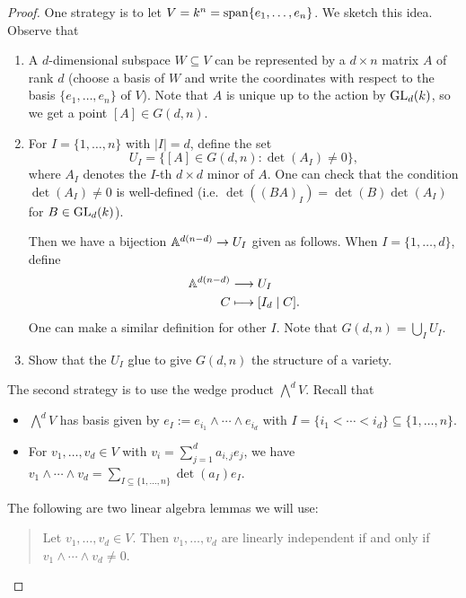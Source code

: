 \begin{proof}
  One strategy is to let
  $V = k^n = \operatorname{span}\{e_1, \dots, e_n\}$.
  We sketch this idea.
  Observe that
  \begin{enumerate}
    \item A $d$-dimensional subspace
      $W \subseteq V$ can be represented by
      a $d \times n$ matrix $A$ of
      rank $d$ (choose a basis of $W$ and
      write the coordinates with respect
      to the basis $\{e_1, \dots, e_n\}$
      of $V$).
      Note that $A$ is unique up to
      the action by
      $\operatorname{GL}_d(k)$, so we get a point
      $[A] \in G(d, n)$.
    \item For $I = \{1, \dots, n\}$ with
      $|I| = d$, define the set
      \[
        U_I = \{
          [A] \in G(d, n)
          : \det(A_I) \ne 0
        \},
      \]
      where $A_I$ denotes the $I$-th
      $d \times d$ minor of $A$.
      One can check that the condition
      $\det(A_I) \ne 0$
      is well-defined
      (i.e. $\det((BA)_I) = \det(B) \det(A_I)$ for $B \in \operatorname{GL}_d(k)$).

    Then we have a bijection
    $\mathbb{A}^{d(n - d)} \to U_I$ given as
    follows. When $I = \{1, \dots, d\}$,
    define
    \begin{align*}
      \mathbb{A}^{d(n - d)} &\longrightarrow U_I \\
      C &\longmapsto
      [ I_d \mid C ].
    \end{align*}
    One can make a similar definition for
    other $I$.
    Note that $G(d, n) = \bigcup_I U_I$.
  \item Show that the $U_I$ glue to give
    $G(d, n)$ the structure of a variety.
  \end{enumerate}
  The second strategy is to use the
  wedge product $\bigwedge^d V$.
  Recall that
  \begin{itemize}
    \item $\bigwedge^d V$ has basis given
      by $e_I := e_{i_1} \wedge \cdots \wedge e_{i_d}$
      with $I = \{i_1 < \cdots < i_d\} \subseteq \{1, \dots, n\}$.
    \item For $v_1, \dots, v_d \in V$
      with $v_i = \sum_{j = 1}^d a_{i, j} e_j$,
      we have
      $v_1 \wedge \cdots \wedge v_d = \sum_{I \subseteq \{1, \dots, n\}} \det(a_I) e_I$.
  \end{itemize}
  The following are two linear algebra
  lemmas we will use:
  \begin{quote}
    \vspace{-2em}
    \begin{lemma}
      Let $v_1, \dots, v_d \in V$. Then
      $v_1, \dots, v_d$ are linearly independent
      if and only if $v_1 \wedge \cdots \wedge v_d \ne 0$.
    \end{lemma}


\end{quote}
\end{proof}
